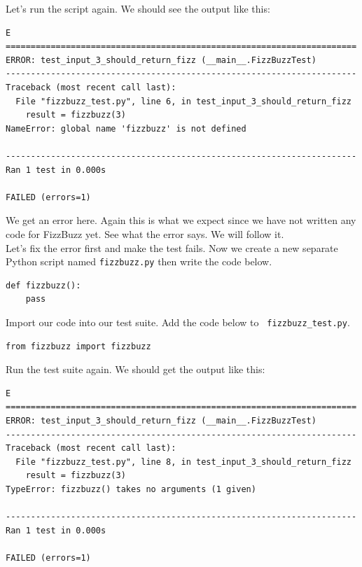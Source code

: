 \documentclass{article}
\begin{document}
\noindent Let's run the script again. We should see the output like this:

\begin{verbatim}
E
======================================================================
ERROR: test_input_3_should_return_fizz (__main__.FizzBuzzTest)
----------------------------------------------------------------------
Traceback (most recent call last):
  File "fizzbuzz_test.py", line 6, in test_input_3_should_return_fizz
    result = fizzbuzz(3)
NameError: global name 'fizzbuzz' is not defined

----------------------------------------------------------------------
Ran 1 test in 0.000s

FAILED (errors=1)
\end{verbatim}

\noindent We get an error here. Again this is what we expect since we have not
written any code for FizzBuzz yet. See what the error says. We will follow it.
\\

\noindent Let's fix the error first and make the test fails. Now we create a
new separate Python script named {\tt fizzbuzz.py} then write the code below.

\begin{verbatim}
def fizzbuzz():
    pass
\end{verbatim}

\noindent Import our code into our test suite. Add the code below to {\tt
fizzbuzz\_test.py}.

\begin{verbatim}
from fizzbuzz import fizzbuzz
\end{verbatim}

\noindent Run the test suite again. We should get the output like this:

\begin{verbatim}
E
======================================================================
ERROR: test_input_3_should_return_fizz (__main__.FizzBuzzTest)
----------------------------------------------------------------------
Traceback (most recent call last):
  File "fizzbuzz_test.py", line 8, in test_input_3_should_return_fizz
    result = fizzbuzz(3)
TypeError: fizzbuzz() takes no arguments (1 given)

----------------------------------------------------------------------
Ran 1 test in 0.000s

FAILED (errors=1)
\end{verbatim}
\end{document}
